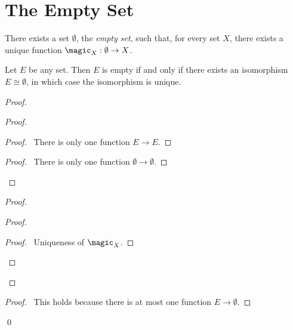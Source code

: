 \section{The Empty Set}

\begin{ax}
  There exists a set $\emptyset$, the \emph{empty set}, such that, for every
  set $X$, there exists a unique function $\magic_X : \emptyset \rightarrow
  X$.
\end{ax}

\begin{prop}
  \label{prop:sets:empty:unique}
  Let $E$ be any set. Then $E$ is empty if and only if there exists an isomorphism $E \cong \emptyset$, in which case the isomorphism is unique.
\end{prop}

\begin{proof}
  \pf
  \begin{proof}
    \begin{proof}
      \pf\ There is only one function $E \rightarrow E$.
    \end{proof}
    \begin{proof}
      \pf\ There is only one function $\emptyset \rightarrow \emptyset$.
    \end{proof}
  \end{proof}
  \begin{proof}
    \begin{proof}
      \begin{proof}
        \pf\ Uniqueness of $\magic_X$.
      \end{proof}
      \qedstep
    \end{proof}
  \end{proof}
  \begin{proof}
    \pf\ This holds because there is at most one function $E \rightarrow \emptyset$.
  \end{proof}
  \qed
\end{proof}

